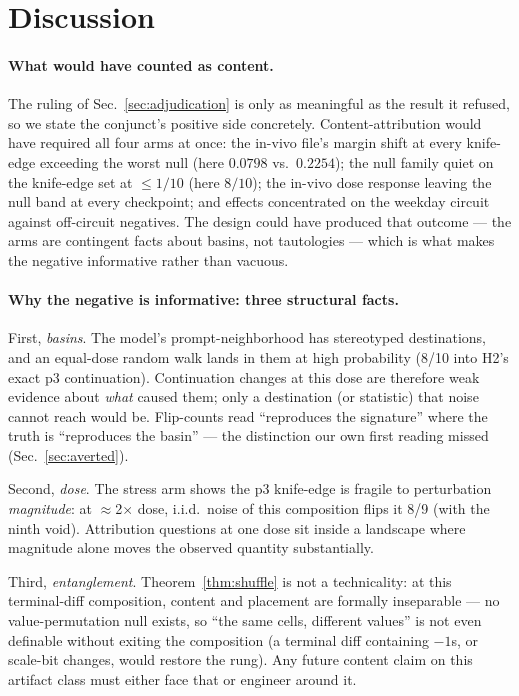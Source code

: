 \section{Discussion}
\label{sec:discussion}

\paragraph{What would have counted as content.}
The ruling of Sec.~\ref{sec:adjudication} is only as meaningful as
the result it refused, so we state the conjunct's positive side
concretely. Content-attribution would have required all four arms at
once: the in-vivo file's margin shift at every knife-edge exceeding
the worst null (here $0.0798$ vs.\ $0.2254$); the null family quiet on
the knife-edge set at $\le 1/10$ (here $8/10$); the in-vivo dose
response leaving the null band at every checkpoint; and effects
concentrated on the weekday circuit against off-circuit negatives.
The design could have produced that outcome --- the arms are
contingent facts about basins, not tautologies --- which is what makes
the negative informative rather than vacuous.

\paragraph{Why the negative is informative: three structural facts.}
First, \emph{basins}. The model's prompt-neighborhood has stereotyped
destinations, and an equal-dose random walk lands in them at high
probability (8/10 into H2's exact p3 continuation). Continuation
changes at this dose are therefore weak evidence about \emph{what}
caused them; only a destination (or statistic) that noise cannot reach
would be. Flip-counts read ``reproduces the signature'' where the
truth is ``reproduces the basin'' --- the distinction our own first
reading missed (Sec.~\ref{sec:averted}).

Second, \emph{dose}. The stress arm shows the p3 knife-edge is
fragile to perturbation \emph{magnitude}: at $\approx$2$\times$ dose,
i.i.d.\ noise of this composition flips it 8/9 (with the ninth void).
Attribution questions at one dose sit inside a landscape where
magnitude alone moves the observed quantity substantially.

Third, \emph{entanglement}. Theorem~\ref{thm:shuffle} is not a
technicality: at this terminal-diff composition, content and placement
are formally inseparable --- no value-permutation null exists, so
``the same cells, different values'' is not even definable without
exiting the composition (a terminal diff containing $-1$s, or scale-bit
changes, would restore the rung). Any future content claim on this
artifact class must either face that or engineer around it.

